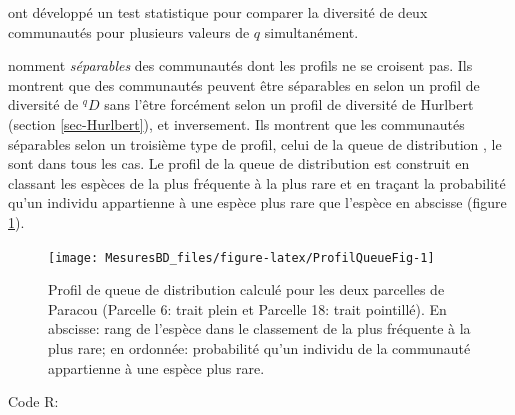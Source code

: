 \documentclass[
  11pt,
  french,
  a4paper,
  extrafontsizes,onecolumn,openright
  ]{memoir}
\begin{document}
\normalsize

\textcite{Pallmann2012} ont développé un test statistique pour comparer la diversité de deux communautés pour plusieurs valeurs de \(q\) simultanément.

\textcite{Liu2006} nomment \emph{séparables} des communautés dont les profils ne se croisent pas.
Ils montrent que des communautés peuvent être séparables en selon un profil de diversité de \(^{q}\!D\) sans l'être forcément selon un profil de diversité de Hurlbert (section \ref{sec-Hurlbert}), et inversement.
Ils montrent que les communautés séparables selon un troisième type de profil, celui de la queue de distribution \autocite{Patil1982}, le sont dans tous les cas.
Le profil de la queue de distribution est construit en classant les espèces de la plus fréquente à la plus rare et en traçant la probabilité qu'un individu appartienne à une espèce plus rare que l'espèce en abscisse (figure \ref{fig:ProfilQueueFig}).



\scriptsize

\begin{figure}

{\centering \texttt{[image: MesuresBD\_files/figure-latex/ProfilQueueFig-1]} 

}

\caption{Profil de queue de distribution calculé pour les deux parcelles de Paracou (Parcelle 6: trait plein et Parcelle 18: trait pointillé). En abscisse: rang de l'espèce dans le classement de la plus fréquente à la plus rare; en ordonnée: probabilité qu'un individu de la communauté appartienne à une espèce plus rare.}\label{fig:ProfilQueueFig}
\end{figure}

\normalsize

Code R:

\scriptsize
\end{document}
